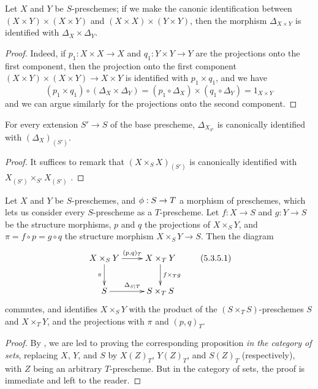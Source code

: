 \begin{prop}[5.3.2]
\label{1.5.3.2}
Let $X$ and $Y$ be $S$-preschemes;
if we make the canonic identification between $(X\times Y)\times(X\times Y)$ and $(X\times X)\times(Y\times Y)$, then the morphism $\Delta_{X\times Y}$ is identified with $\Delta_X\times\Delta_Y$.
\end{prop}

\begin{proof}
\label{proof-1.5.3.2}
Indeed, if $p_1:X\times X\to X$ and $q_1:Y\times Y\to Y$ are the projections onto the first component, then the projection onto the first component $(X\times Y)\times(X\times Y)\to X\times Y$ is identified with $p_1\times q_1$, and we have
\[
    (p_1\times q_1)\circ(\Delta_X\times\Delta_Y)=(p_1\circ\Delta_X)\times(q_1\circ\Delta_Y)=1_{X\times Y}
\]
and we can argue similarly for the projections onto the second component.
\end{proof}

\begin{cor}[5.3.4]
\label{1.5.3.4}
For every extension $S'\to S$ of the base prescheme, $\Delta_{X_{S'}}$ is canonically identified with $(\Delta_X)_{(S')}$.
\end{cor}

\begin{proof}
\label{proof-1.5.3.4}
It suffices to remark that $(X\times_S X)_{(S')}$ is canonically identified with $X_{(S')}\times_{S'}X_{(S')}$ .
\end{proof}

\begin{prop}[5.3.5]
\label{1.5.3.5}
Let $X$ and $Y$ be $S$-preschemes, and $\vphi:S\to T$ a morphism of preschemes, which lets us consider every $S$-prescheme as a $T$-prescheme.
Let $f:X\to S$ and $g:Y\to S$ be the structure morphisms, $p$ and $q$ the projections of $X\times_S Y$, and $\pi=f\circ p=g\circ q$ the structure morphism $X\times_S Y\to S$.
Then the diagram
\[
  \xymatrix{
    X\times_S Y\ar[r]^{(p,q)_T}\ar[d]_\pi &
    X\times_T Y\ar[d]^{f\times_T g}\\
    S\ar[r]^{\Delta_{S|T}} &
    S\times_T S
  }
  \tag{5.3.5.1}
\]
commutes, and identifies $X\times_S Y$ with the product of the $(S\times_T S)$-preschemes $S$ and $X\times_T Y$, and the projections with $\pi$ and $(p,q)_T$.
\end{prop}

\begin{proof}
\label{proof-1.5.3.5}
By , we are led to proving the corresponding proposition \emph{in the category of sets}, replacing $X$, $Y$, and $S$ by $X(Z)_T$, $Y(Z)_T$, and $S(Z)_T$ (respectively), with $Z$ being an arbitrary $T$-prescheme.
But in the category of sets, the proof is immediate and left to the reader.
\end{proof}

